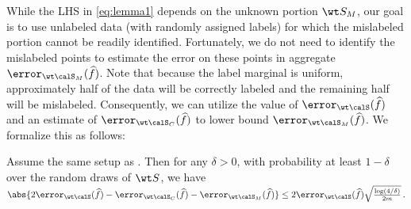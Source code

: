 % 
% 
% 
While the LHS in \eqref{eq:lemma1} depends 
on the unknown portion $\wt S_M$, 
our goal is to use unlabeled data 
(with randomly assigned labels)
for which the mislabeled portion 
cannot be readily identified. 
Fortunately, we do not need to identify
the mislabeled points to estimate
the error on these points in aggregate
$\error_{\wt\calS_M}(\widehat f)$.
% 
% 
Note that because the label marginal is uniform, 
approximately half of the 
data
will be correctly labeled 
and the remaining half will be mislabeled. 
Consequently, we can utilize the value 
of $\error_{\wt\calS}(\widehat f)$ 
and an estimate of $\error_{\wt\calS_C}(\widehat f)$ 
to lower bound $\error_{\wt\calS_M}(\widehat f)$. 
We formalize this as follows: 

\begin{lemma} \label{lem:mislabeled_error}
    Assume the same setup as . Then for any $\delta >0$, with probability at least $1-\delta$ over the random draws of $\wt S$, we have  
        $\abs{2\error_{\wt \calS}(\widehat f) - \error_{\wt \calS_C}(\widehat f) -  \error_{\wt \calS_M}(\widehat f) } \le  2\error_{\wt \calS}(\widehat f)  \sqrt{\frac{\log(4/\delta)}{2m}}\,. $ %
\end{lemma} 




